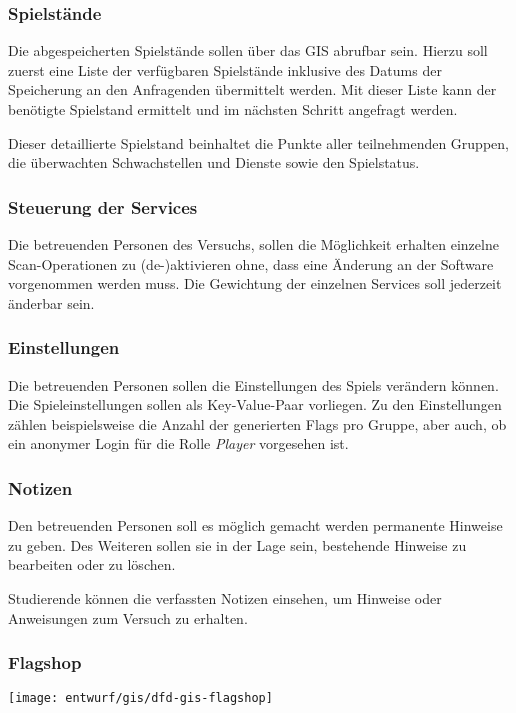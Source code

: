 \subsubsection{Spielstände}

Die abgespeicherten Spielstände sollen über das GIS abrufbar sein. Hierzu soll zuerst eine Liste der verfügbaren Spielstände inklusive des Datums der Speicherung an den Anfragenden übermittelt werden. Mit dieser Liste kann der benötigte Spielstand ermittelt und im nächsten Schritt angefragt werden. 

Dieser detaillierte Spielstand beinhaltet die Punkte aller teilnehmenden Gruppen, die überwachten Schwachstellen und Dienste sowie den Spielstatus.

\subsubsection{Steuerung der Services}

Die betreuenden Personen des Versuchs, sollen die Möglichkeit erhalten einzelne Scan-Operationen zu (de-)aktivieren ohne, dass eine Änderung an der Software vorgenommen werden muss. Die Gewichtung der einzelnen Services soll jederzeit änderbar sein.

\subsubsection{Einstellungen}

Die betreuenden Personen sollen die Einstellungen des Spiels verändern können. Die Spieleinstellungen sollen als Key-Value-Paar vorliegen. Zu den Einstellungen zählen beispielsweise die Anzahl der generierten Flags pro Gruppe, aber auch, ob ein anonymer Login für die Rolle \textit{Player} vorgesehen ist.

\subsubsection{Notizen}

Den betreuenden Personen soll es möglich gemacht werden permanente Hinweise zu geben. Des Weiteren sollen sie in der Lage sein, bestehende Hinweise zu bearbeiten oder zu löschen.

Studierende können die verfassten Notizen einsehen, um Hinweise oder Anweisungen zum Versuch zu erhalten.

\subsubsection{Flagshop}
\begin{center}
	\texttt{[image: entwurf/gis/dfd-gis-flagshop]}
\end{center}


